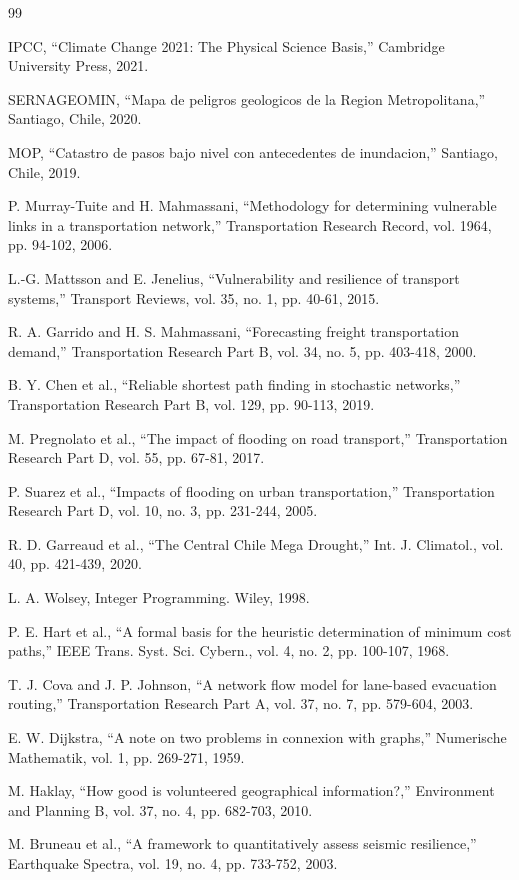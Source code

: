 \documentclass[conference]{IEEEtran}
\begin{document}
\begin{thebibliography}{99}

IPCC, ``Climate Change 2021: The Physical Science Basis,'' Cambridge University Press, 2021.

SERNAGEOMIN, ``Mapa de peligros geologicos de la Region Metropolitana,'' Santiago, Chile, 2020.

MOP, ``Catastro de pasos bajo nivel con antecedentes de inundacion,'' Santiago, Chile, 2019.

P. Murray-Tuite and H. Mahmassani, ``Methodology for determining vulnerable links in a transportation network,'' Transportation Research Record, vol. 1964, pp. 94-102, 2006.

L.-G. Mattsson and E. Jenelius, ``Vulnerability and resilience of transport systems,'' Transport Reviews, vol. 35, no. 1, pp. 40-61, 2015.

R. A. Garrido and H. S. Mahmassani, ``Forecasting freight transportation demand,'' Transportation Research Part B, vol. 34, no. 5, pp. 403-418, 2000.

B. Y. Chen et al., ``Reliable shortest path finding in stochastic networks,'' Transportation Research Part B, vol. 129, pp. 90-113, 2019.

M. Pregnolato et al., ``The impact of flooding on road transport,'' Transportation Research Part D, vol. 55, pp. 67-81, 2017.

P. Suarez et al., ``Impacts of flooding on urban transportation,'' Transportation Research Part D, vol. 10, no. 3, pp. 231-244, 2005.

R. D. Garreaud et al., ``The Central Chile Mega Drought,'' Int. J. Climatol., vol. 40, pp. 421-439, 2020.

L. A. Wolsey, Integer Programming. Wiley, 1998.

P. E. Hart et al., ``A formal basis for the heuristic determination of minimum cost paths,'' IEEE Trans. Syst. Sci. Cybern., vol. 4, no. 2, pp. 100-107, 1968.

T. J. Cova and J. P. Johnson, ``A network flow model for lane-based evacuation routing,'' Transportation Research Part A, vol. 37, no. 7, pp. 579-604, 2003.

E. W. Dijkstra, ``A note on two problems in connexion with graphs,'' Numerische Mathematik, vol. 1, pp. 269-271, 1959.

M. Haklay, ``How good is volunteered geographical information?,'' Environment and Planning B, vol. 37, no. 4, pp. 682-703, 2010.

M. Bruneau et al., ``A framework to quantitatively assess seismic resilience,'' Earthquake Spectra, vol. 19, no. 4, pp. 733-752, 2003.

\end{thebibliography}
\end{document}
